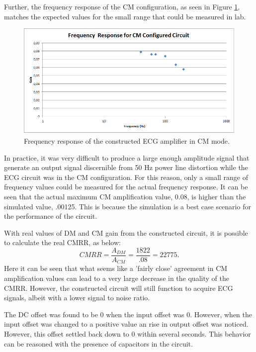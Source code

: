 \documentclass[pdftex,12pt,letterpaper]{article}
\begin{document}
Further, the frequency response of the CM configuration, as seen in Figure \ref{fig:CM_response}, matches the expected values for the small range that could be measured in lab.
\begin{figure}[H]
\begin{center}
\includegraphics[scale=.5]{fig2.png}
\caption{Frequency response of the constructed ECG amplifier in CM mode.}
\label{fig:CM_response}
\end{center}
\end{figure}
In practice, it was very difficult to produce a large enough amplitude signal that generate an output signal discernible from 50 Hz power line distortion while the ECG circuit was in the CM configuration. For this reason, only a small range of frequency values could be measured for the actual frequency response. It can be seen that the actual maximum CM amplification value, 0.08, is higher than the simulated value, .00125. This is because the simulation is a best case scenario for the performance of the circuit.

With real values of DM and CM gain from the constructed circuit, it is possible to calculate the real CMRR, as below:
$$
CMRR = \frac{A_{DM}}{A_{CM}} = \frac{1822}{.08} = 22775.
$$
Here it can be seen that what seems like a 'fairly close' agreement in CM amplification values can lead to a very large decrease in the quality of the CMRR. However, the constructed circuit will still function to acquire ECG signals, albeit with a lower signal to noise ratio.

The DC offset was found to be 0 when the input offset was 0. However, when the input offset was changed to a positive value an rise in output offset was noticed. However, this offset settled back down to 0 within several seconds. This behavior can be reasoned with the presence of capacitors in the circuit. 
\end{document}
